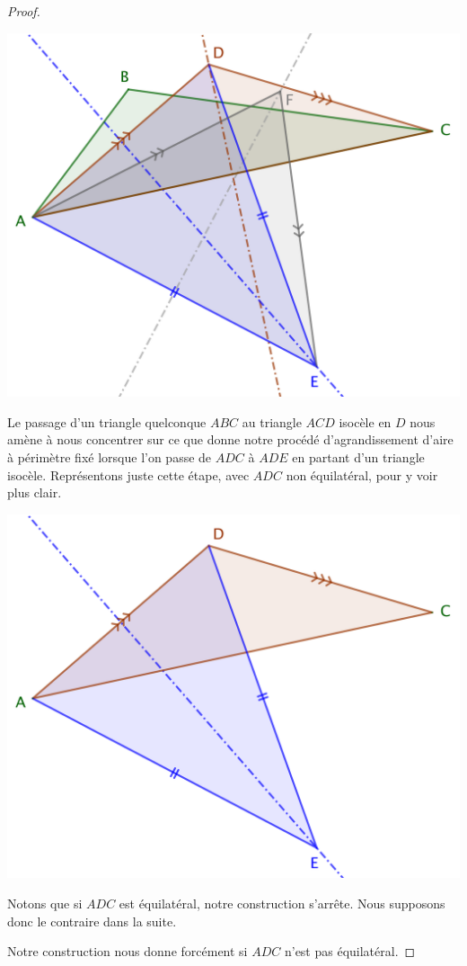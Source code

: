 \begin{proof}
	\begin{center}
		\includegraphics[scale=.4]{content/triangle-gene/triangle-conj.png}
	\end{center} 

	
	Le passage d'un triangle quelconque $ABC$ au triangle $ACD$ isocèle en $D$ nous amène à nous concentrer sur ce que donne notre procédé d'agrandissement d'aire à périmètre fixé lorsque l'on passe de $ADC$ à $ADE$ en partant d'un triangle isocèle. Représentons juste cette étape, avec $ADC$ non équilatéral, pour y voir plus clair.

	\begin{center}
		\includegraphics[scale=.4]{content/triangle-gene/triangle-proof.png}
	\end{center} 
	
	
	Notons que si $ADC$ est équilatéral, notre construction s'arrête.
	Nous supposons donc le contraire dans la suite.


		\item Notre construction nous donne forcément si $ADC$ n'est pas équilatéral.


\end{proof}


